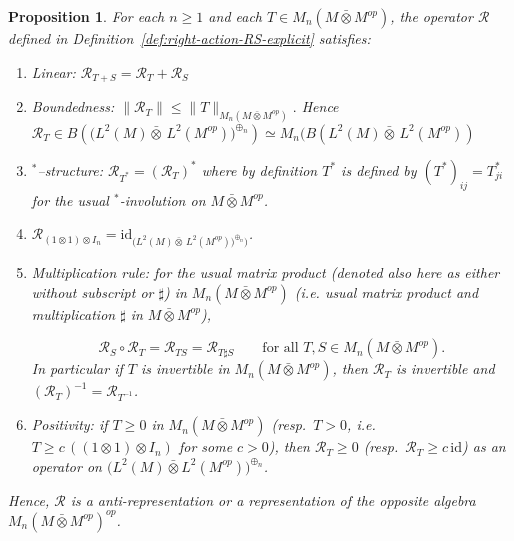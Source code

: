 \documentclass[10pt,a4paper,reqno]{amsart}
\newtheorem{proposition}[theorem]{Proposition}
\begin{document}
\begin{proposition}\label{prop:S-T-rep-positivity-explicit}
For each $n\ge1$ and each $T\in M_n(M\bar\otimes M^{op})$, the operator
$\mathcal R$ defined in Definition~\ref{def:right-action-RS-explicit} satisfies:
\begin{enumerate}
  \item \emph{Linear}: $\mathcal{R}_{T+S}=\mathcal R_{T} +\mathcal R_S$
  \item \emph{Boundedness:} $
  \|\mathcal R_T\|\le \|T\|_{M_n(M\bar\otimes M^{op})}.$
  \newline
  Hence $\mathcal{R}_T\in B(\big(L^2(M){\bar\otimes}\,L^2(M^{op})\big)^{\oplus_n})\simeq M_n(B(L^2(M){\bar\otimes}\,L^2(M^{op}))$



  \item \emph{$^\ast$–structure:} $\mathcal R_{T^\ast}=(\mathcal R_T)^\ast$ where by definition $T^*$ is defined by $(T^*)_{ij}=T_{ji}^*$ for the usual $^*$-involution on $M\bar\otimes M^{op}$.


\item $\mathcal R_{(1\otimes 1)\otimes I_n}=\mathrm{id}_{\big(L^2(M){\bar\otimes}\,L^2(M^{op})\big)^{\oplus_n})}$.
  \item \emph{Multiplication rule:}
  for the usual matrix product (denoted also here as either without subscript or $\sharp$) in $M_n(M\bar\otimes M^{op})$ (i.e. usual matrix product and multiplication $\sharp$ in $M\bar\otimes M^{op}$),
  

\[
  \mathcal R_S\circ\mathcal R_T=\mathcal R_{T S}=\mathcal R_{T\sharp S}
  \qquad\text{for all }T,S\in M_n(M\bar\otimes M^{op}).
  \]
In particular if $T$ is invertible in $M_n(M\bar\otimes M^{op})$, then $\mathcal R_T$ is invertible and $(\mathcal R_T)^{-1}=\mathcal R_{T^{-1}}$.


    \item \emph{Positivity:}
  if $T\ge 0$ in $M_n(M\bar\otimes M^{op})$ (resp.\ $T>0$, i.e.\ $T\ge c\,((1\otimes 1)\otimes I_n)$ for some $c>0$), then 
  $\mathcal R_T\ge 0$ (resp.\ $\mathcal R_T\ge c\,\mathrm{id}$) as an operator on 
  $\big(L^2(M)\bar\otimes L^2(M^{op})\big)^{\oplus_n}$.
\end{enumerate}
Hence, $\mathcal{R}$ is a anti-representation or a representation of the opposite algebra $M_n(M\bar\otimes M^{op})^{op}$.
\end{proposition}
\end{document}
